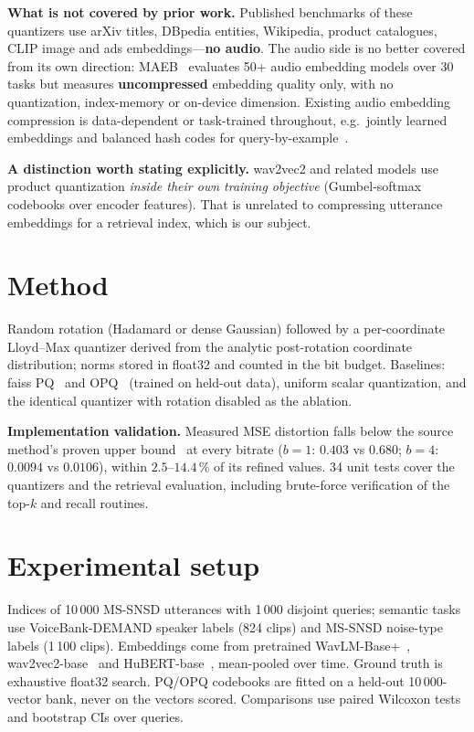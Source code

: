 \documentclass[conference]{IEEEtran}
\newcommand{\eg}{e.g.\ }
\begin{document}
\textbf{What is not covered by prior work.} Published benchmarks of these quantizers use arXiv
titles, DBpedia entities, Wikipedia, product catalogues, CLIP image and ads embeddings---\textbf{no
audio}. The audio side is no better covered from its own direction: MAEB~\cite{maeb2026} evaluates
50+ audio embedding models over 30 tasks but measures \textbf{uncompressed} embedding quality only,
with no quantization, index-memory or on-device dimension. Existing audio embedding compression is
data-dependent or task-trained throughout, \eg jointly learned embeddings and balanced hash codes
for query-by-example~\cite{singh2022}.

\textbf{A distinction worth stating explicitly.} wav2vec2 and related models use product
quantization \emph{inside their own training objective} (Gumbel-softmax codebooks over encoder
features). That is unrelated to compressing utterance embeddings for a retrieval index, which is
our subject.

\section{Method}

Random rotation (Hadamard or dense Gaussian) followed by a per-coordinate Lloyd--Max quantizer
derived from the analytic post-rotation coordinate distribution; norms stored in float32 and
counted in the bit budget. Baselines: faiss PQ~\cite{jegou2011} and OPQ~\cite{ge2013} (trained on
held-out data), uniform scalar quantization, and the identical quantizer with rotation disabled as
the ablation.

\textbf{Implementation validation.} Measured MSE distortion falls below the source method's proven
upper bound~\cite{zandieh2025} at every bitrate ($b{=}1$: $0.403$ vs $0.680$; $b{=}4$: $0.0094$ vs
$0.0106$), within $2.5$--$14.4\,\%$ of its refined values. 34 unit tests cover the quantizers and
the retrieval evaluation, including brute-force verification of the top-$k$ and recall routines.

\section{Experimental setup}

Indices of 10\,000 MS-SNSD utterances with 1\,000 disjoint queries; semantic tasks use
VoiceBank-DEMAND speaker labels (824 clips) and MS-SNSD noise-type labels (1\,100 clips).
Embeddings come from pretrained WavLM-Base+~\cite{chen2022}, wav2vec2-base~\cite{baevski2020} and
HuBERT-base~\cite{hsu2021}, mean-pooled over time. Ground truth is exhaustive float32 search.
PQ/OPQ codebooks are fitted on a held-out 10\,000-vector bank, never on the vectors scored.
Comparisons use paired Wilcoxon tests and bootstrap CIs over queries.
\end{document}
